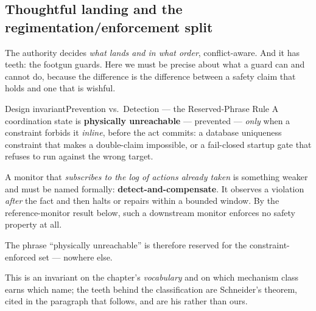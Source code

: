 \documentclass[11pt,a4paper]{article}
\theoremstyle{definition}
\theoremstyle{plain}
\begin{document}
\subsection{Thoughtful landing and the regimentation/enforcement split}\label{sec:landing}

The authority decides \emph{what lands and in what order}, conflict-aware. And it has
teeth: the footgun guards. Here we must be precise about what a guard can and cannot
do, because the difference is the difference between a safety claim that holds and one
that is wishful.

\begin{pdclaim}{Design invariant}{Prevention vs.\ Detection --- the Reserved-Phrase Rule}
\setlength{\parskip}{4pt plus 1pt}
\label{prop:regiment}
A coordination state is \textbf{physically unreachable} --- prevented --- \emph{only}
when a constraint forbids it \emph{inline}, before the act commits: a database
uniqueness constraint that makes a double-claim impossible, or a fail-closed startup
gate that refuses to run against the wrong target.

A monitor that \emph{subscribes to
the log of actions already taken} is something weaker and must be named formally:
\textbf{detect-and-compensate}. It observes a violation \emph{after} the fact and
then halts or repairs within a bounded window. By the reference-monitor result below,
such a downstream monitor enforces no safety property at all.

The phrase ``physically
unreachable'' is therefore reserved for the constraint-enforced set --- nowhere else.

This is an invariant on the chapter's \emph{vocabulary} and on which mechanism class
earns which name; the teeth behind the classification are Schneider's theorem, cited
in the paragraph that follows, and are his rather than ours.
\end{pdclaim}
\end{document}
